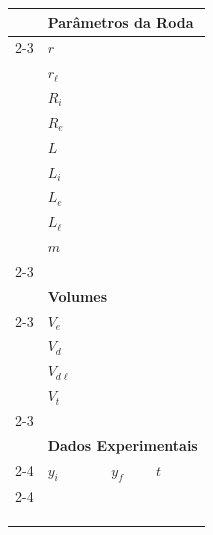 \begin{table}[!ht]
    \centering
    \begin{tabular}{lp{25mm}p{25mm}p{25mm}l}
    \toprule
        &\multicolumn{4}{l}{\textbf{Parâmetros da Roda}} \\
        \cmidrule{2-3}
        & $r$ \cellcolor[gray]{0.95} & \cellcolor[gray]{0.97} \\
        & $r_\ell$ \cellcolor[gray]{0.89} & \cellcolor[gray]{0.92} \\
        & $R_i$ \cellcolor[gray]{0.95} & \cellcolor[gray]{0.97} \\
        & $R_e$ \cellcolor[gray]{0.89} & \cellcolor[gray]{0.92} \\
        & $L$ \cellcolor[gray]{0.95} & \cellcolor[gray]{0.97} \\
        & $L_i$ \cellcolor[gray]{0.89} & \cellcolor[gray]{0.92} \\
        & $L_e$ \cellcolor[gray]{0.95} & \cellcolor[gray]{0.97} \\
        & $L_\ell$ \cellcolor[gray]{0.89} & \cellcolor[gray]{0.92} \\
        & $m$ \cellcolor[gray]{0.95} & \cellcolor[gray]{0.97} \\
        \cmidrule{2-3}
        \\
        &\multicolumn{4}{l}{\textbf{Volumes}} \\
        \cmidrule{2-3}
        & $V_e$ \cellcolor[gray]{0.89} & \cellcolor[gray]{0.92} \\
        & $V_d$ \cellcolor[gray]{0.95} & \cellcolor[gray]{0.97} \\
        & $V_{d\ell}$ \cellcolor[gray]{0.89} & \cellcolor[gray]{0.92} \\
        & $V_t$ \cellcolor[gray]{0.95} & \cellcolor[gray]{0.97} \\
        \cmidrule{2-3}
        \\
        &\multicolumn{4}{l}{\textbf{Dados Experimentais}} \\
        \cmidrule{2-4}
        & $y_i$ & $y_f$ & $t$ & \\
        \cmidrule{2-4}
        & \cellcolor[gray]{0.89} & \cellcolor[gray]{0.92} & \cellcolor[gray]{0.89} \\
        & \cellcolor[gray]{0.95} & \cellcolor[gray]{0.97} & \cellcolor[gray]{0.95} \\
        & \cellcolor[gray]{0.89} & \cellcolor[gray]{0.92} & \cellcolor[gray]{0.89} \\
        & \cellcolor[gray]{0.95} & \cellcolor[gray]{0.97} & \cellcolor[gray]{0.95} \\

\end{tabular}
\end{table}
